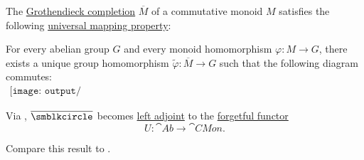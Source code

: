 \begin{theorem}\label{thm:grothendieck_monoid_completion_universal_property}
  The \hyperref[def:monoid_grothendieck_completion]{Grothendieck completion} \( \overline{M} \) of a commutative monoid \( M \) satisfies the following \hyperref[rem:universal_mapping_property]{universal mapping property}:
  \begin{displayquote}
    For every abelian group \( G \) and every monoid homomorphism \( \varphi: M \to G \), there exists a unique group homomorphism \( \widetilde{\varphi}: \overline{M} \to G \) such that the following diagram commutes:
    \begin{equation}\label{eq:thm:grothendieck_monoid_completion_universal_property/diagram}
      \begin{aligned}
        \texttt{[image: output/thm\_\_grothendieck\_monoid\_completion\_universal\_property.pdf]}
      \end{aligned}
    \end{equation}
  \end{displayquote}

  Via , \( \overline{\anon} \) becomes \hyperref[def:category_adjunction]{left adjoint} to the \hyperref[def:concrete_category]{forgetful functor}
  \begin{equation*}
    U: \cat{Ab} \to \cat{CMon}.
  \end{equation*}

  Compare this result to .
\end{theorem}
